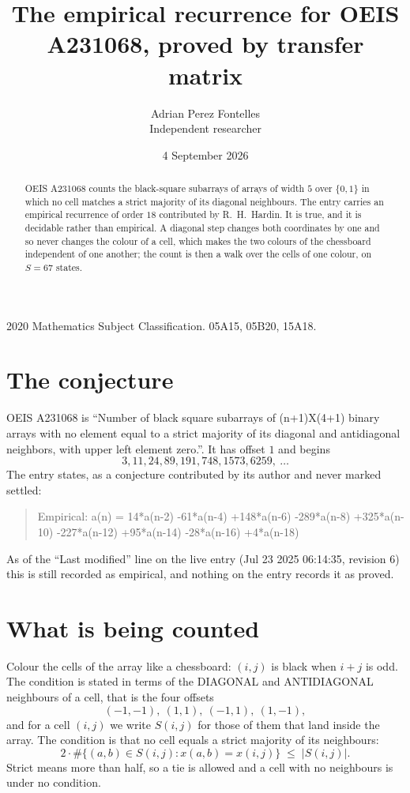 \documentclass[11pt,a4paper]{article}
\title{The empirical recurrence for OEIS A231068, proved by transfer matrix}
\author{Adrian Perez Fontelles\\ \small Independent researcher}
\date{4 September 2026}
\theoremstyle{plain}
\theoremstyle{definition}
\begin{document}
\maketitle

\begin{abstract}
OEIS A231068 counts the black-square subarrays of arrays of width $5$ over $\{0,1\}$ in which
no cell matches a strict majority of its diagonal neighbours. The entry carries an empirical recurrence of order $18$ contributed by
R.~H.~Hardin. It is true, and it is decidable rather than empirical. A diagonal step changes
both coordinates by one and so never changes the colour of a cell, which makes the two colours
of the chessboard independent of one another; the count is then a walk over the cells of one
colour, on $S=67$ states.
\end{abstract}

\noindent\small 2020 Mathematics Subject Classification. 05A15, 05B20, 15A18.\normalsize

\section{The conjecture}

OEIS A231068 is ``Number of black square subarrays of (n+1)X(4+1) binary arrays with no element equal to a strict majority of its diagonal and antidiagonal neighbors, with upper left element zero.''. It has offset $1$ and begins
\[
3, 11, 24, 89, 191, 748, 1573, 6259,\ \dots
\]
The entry states, as a conjecture contributed by its author and never marked settled:
\begin{quote}
Empirical: a(n) = 14*a(n-2) -61*a(n-4) +148*a(n-6) -289*a(n-8) +325*a(n-10) -227*a(n-12) +95*a(n-14) -28*a(n-16) +4*a(n-18)
\end{quote}
As of the ``Last modified'' line on the live entry (Jul 23 2025 06:14:35, revision 6) this is still
recorded as empirical, and nothing on the entry records it as proved.

\section{What is being counted}

Colour the cells of the array like a chessboard: $(i,j)$ is black when $i+j$ is odd. The
condition is stated in terms of the DIAGONAL and ANTIDIAGONAL neighbours of a cell, that is the
four offsets
\[
(-1,-1),\ (1,1),\ (-1,1),\ (1,-1),
\]
and for a cell $(i,j)$ we write $S(i,j)$ for those of them that land inside the array. The
condition is that no cell equals a strict majority of its neighbours:
\[
2\cdot\#\{(a,b)\in S(i,j) : x(a,b)=x(i,j)\}\;\le\;|S(i,j)| .
\]
Strict means more than half, so a tie is allowed and a cell with no neighbours is under no condition.
\end{document}
